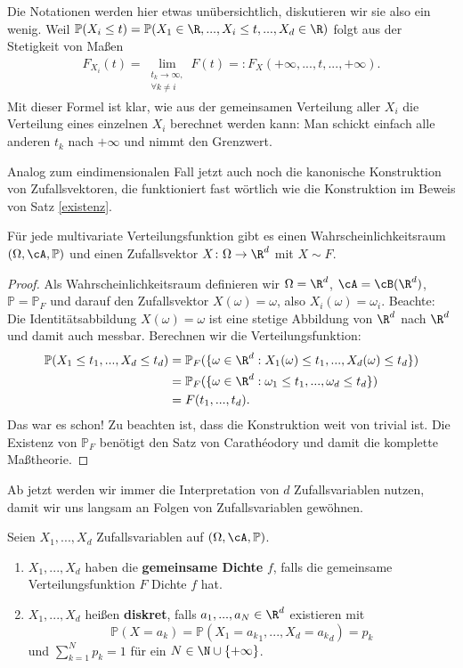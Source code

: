 Die Notationen werden hier etwas un\"ubersichtlich, diskutieren wir sie also ein wenig. Weil $\mathbb P(X_i\leq t)=\mathbb P(X_1\in \R, ..., X_i\leq t, ..., X_d\in \R)$ folgt aus der Stetigkeit von Ma\ss en
\begin{align*}
	F_{X_i}(t) =\lim\limits_{\substack{t_k \to \infty,\\ \forall k\neq i}} F(t)=: F_X(+\infty,..., t, ...,+\infty).
\end{align*}
Mit dieser Formel ist klar, wie aus der gemeinsamen Verteilung aller $X_i$ die Verteilung eines einzelnen $X_i$ berechnet werden kann: Man schickt einfach alle anderen $t_k$ nach $+\infty$ und nimmt den Grenzwert. \smallskip

Analog zum eindimensionalen Fall jetzt auch noch die kanonische Konstruktion von Zufallsvektoren, die funktioniert fast w\"ortlich wie die Konstruktion im Beweis von Satz \ref{existenz}.
\begin{satz}\label{kan}
	Für jede multivariate Verteilungsfunktion gibt es einen Wahrscheinlichkeitsraum $(\Omega, \cA, \mathbb{P})$ und einen Zufallsvektor $X \colon \Omega \to \R^d$ mit $X \sim F$.
\end{satz}
\begin{proof}
	Als Wahrscheinlichkeitsraum definieren wir $\Omega=\R^d$, $\cA = \cB(\R^d)$, $\mathbb{P} = \mathbb{P}_F$ und darauf den Zufallsvektor $X(\omega) = \omega$, also $X_i(\omega)=\omega_i$. Beachte: Die Identit\"atsabbildung $X(\omega)=\omega$ ist eine stetige Abbildung von $\R^d$ nach $\R^d$ und damit auch messbar. Berechnen wir die Verteilungsfunktion:
	\begin{align*} 
		\mathbb{P}(X_1\leq t_1, ..., X_d\leq t_d) 
		&=	\mathbb{P}_F(\{\omega \in \R^d: X_1(\omega) \leq t_1, ..., X_d(\omega)\leq t_d\})\\
		&=\mathbb{P}_F(\{\omega \in \R^d: \omega_1\leq t_1, ..., \omega_d\leq t_d\})\\
		&=F(t_1,...,t_d).
 \end{align*} 
	Das war es schon! Zu beachten ist, dass die Konstruktion weit von trivial ist. Die Existenz von $\mathbb P_F$ ben\"otigt den Satz von Carath\'eodory und damit die komplette Ma\ss theorie. 
\end{proof}
Ab jetzt werden wir immer die Interpretation von $d$ Zufallsvariablen nutzen, damit wir uns langsam an Folgen von Zufallsvariablen gew\"ohnen. 
\begin{deff}
	Seien $X_1,...,X_d$ Zufallsvariablen auf $(\Omega, \cA, \mathbb{P})$.
	\begin{enumerate}[label=(\roman*)]
		\item $X_1,...,X_d$ haben die \textbf{gemeinsame Dichte} $f$, falls die gemeinsame Verteilungsfunktion $F$ Dichte $f$ hat.
		\item $X_1,...,X_d$ heißen \textbf{diskret}, falls $a_1,...,a_N \in \R^d$ existieren mit $$\mathbb{P}(X=a_k) = \mathbb{P}(X_1={a_k}_1,..., X_d = {a_k}_d) = p_k$$ und $ \sum_{k=1}^{N} p_k = 1$ f\"ur ein $N \in \N \cup \{ +\infty \}  $.
	\end{enumerate}
\end{deff}
